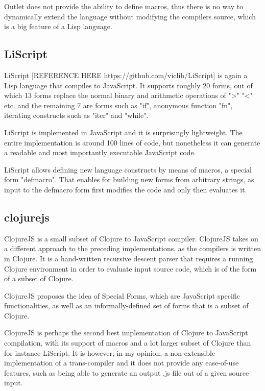 Outlet does not provide the ability to define macros, thus there is no way to dynamically extend the language without modifying the compilers source, which is a big feature of a Lisp language.

\subsection{LiScript}
LiScript [REFERENCE HERE https://github.com/viclib/LiScript] is again a Lisp language that compiles to JavaScript. It supports roughly 20 forms, out of which 13 forms replace the normal binary and arithmetic operations of ">" "<" etc. and the remaining 7 are forms such as "if", anonymous function "fn", iterating constructs such as "iter" and "while".

LiScript is implemented in JavaScript and it is surprisingly lightweight. The entire implementation is around 100 lines of code, but nonetheless it can generate a readable and most importantly executable JavaScript code. 

LiScript allows defining new language constructs by means of macros, a special form "defmacro". That enables for building new forms from arbitrary strings, as input to the defmacro form first modifies the code and only then evaluates it. 

\subsection{clojurejs}
ClojureJS is a small subset of Clojure to JavaScript compiler.
ClojureJS takes on a different approach to the preceding implementations, as the compilers is written in Clojure. 
It is a hand-written recursive descent parser that requires a running Clojure environment in order to evaluate input source code, which is of the form of a subset of Clojure.

ClojureJS proposes the idea of Special Forms, which are JavaScript specific functionalities, as well as an informally-defined set of forms that is a subset of Clojure.

ClojureJS is perhaps the second best implementation of Clojure to JavaScript compilation, with its support of macros and a lot larger subset of Clojure than for instance LiScript. 
It is however, in my opinion, a non-extensible implementation of a trans-compiler and it does not provide any ease-of-use features, such as being able to generate an output .js file out of a given source input. 
